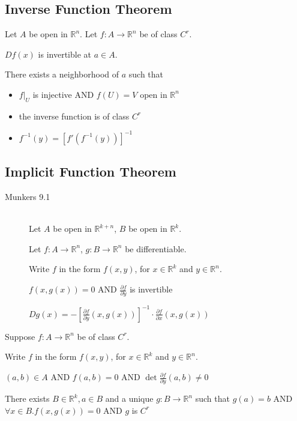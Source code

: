 \subsection{Inverse Function Theorem}
\label{thm_ivft}
Let $A$ be open in $\mathbb{R}^n$.
	Let $f:A\to\mathbb{R}^n$ be of class $C^r$.

\thmIF
	$Df(x)$ is invertible at $a\in A$.
	
\thmTHEN
	There exists a neighborhood of $a$ such that
\begin{itemize}
	\item $f|_U$ is injective AND $f(U)=V$ open in $\mathbb{R}^n$
	\item the inverse function is of class $C^r$
	\item $f^{-1}(y)=[f'(f^{-1}(y))]^{-1}$
\end{itemize}


\subsection{Implicit Function Theorem}
\label{thm_ipft}
\begin{description}
	\item[Munkers 9.1] \hfill \\
		Let $A$ be open in $\mathbb{R}^{k+n}$, $B$ be open in $\mathbb{R}^k$.
		
		Let $f:A\to \mathbb{R}^n$, $g:B\to \mathbb{R}^n$ be differentiable.
		
		Write $f$ in the form $f(x, y)$, for $x\in \mathbb{R}^k$ and $y\in \mathbb{R}^n$.
		
		\thmIF $f(x, g(x))=0$ AND $\frac{\partial f}{\partial y}$ is invertible
		
		\thmTHEN $Dg(x)=-\left[\frac{\partial f}{\partial y}(x,g(x))\right]^{-1}\cdot \frac{\partial f}{\partial x}(x,g(x))$
\end{description}

Suppose $f:A\to \mathbb{R}^n$ be of class $C^r$.

Write $f$ in the form $f(x, y)$, for $x\in \mathbb{R}^k$ and $y\in \mathbb{R}^n$.

\thmIF $(a, b)\in A$ AND $f(a, b)=0$ AND $\det \frac{\partial f}{\partial y}(a,b)\neq 0$

\thmTHEN There exists $B\in \mathbb{R}^k, a \in B$ and a unique $g:B\to \mathbb{R}^n$ such that
		$g(a)=b$ AND $\forall x\in B. f(x,g(x))=0$ AND $g$ is $C^r$